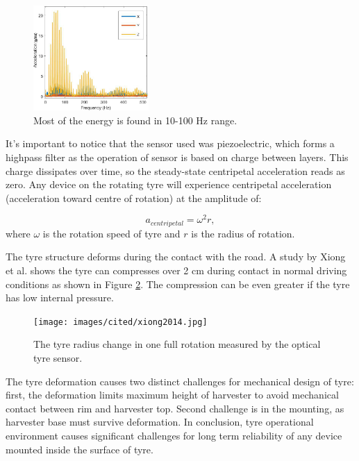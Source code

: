 \begin{figure}[htb]
\begin{center}
\includegraphics[height=4cm]{images/matlab_figures/fft.jpg}
\end{center}
\caption{Most of the energy is found in 10-100 Hz range.}
\label{80_FFT_zoom}
\end{figure}

It's important to notice that the sensor used was piezoelectric, which forms a highpass filter as the operation of sensor is based on charge between layers. This charge dissipates over time, so the steady-state centripetal acceleration reads as zero. Any device on the rotating tyre will experience centripetal acceleration (acceleration toward centre of rotation) at the amplitude of: 

\begin{equation}
  a_{centripetal} = \omega^2 r,
\end{equation}
where $\omega$ is the rotation speed of tyre and $r$ is the radius of rotation.

The tyre structure deforms during the contact with the road. A study by Xiong et al. \cite{Xiong2014} shows the tyre can compresses over 2 cm during contact in normal driving conditions as shown in Figure \ref{fig:deformation}. The compression can be even greater if the tyre has low internal pressure. 

\begin{figure}[htb]
    \begin{center}
    \texttt{[image: images/cited/xiong2014.jpg]}
    \end{center}
    \caption{\label{fig:deformation} The tyre radius change in one full rotation measured by the optical tyre sensor. \cite{Xiong2014}}
\end{figure}

The tyre deformation causes two distinct challenges for mechanical design of tyre: first, the deformation limits maximum height of harvester to avoid mechanical contact between rim and harvester top. Second challenge is in the mounting, as harvester base must survive deformation. In conclusion, tyre operational environment causes significant challenges for long term reliability of any device mounted inside the surface of tyre. 
